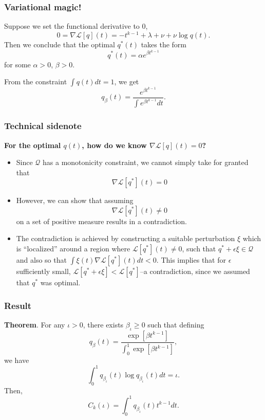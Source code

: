 \documentclass{beamer}
\begin{document}
\begin{frame}
\frametitle{Variational magic!}
Suppose we set the functional derivative to 0,
\[
0 = \nabla \mathcal{L}[q](t) = -t^{k-1} + \lambda + \nu + \nu \log q(t).
\]
Then we conclude that the optimal $q^*(t)$ takes the form
\[
q^*(t) = \alpha e^{\beta t^{k-1}}
\]
for some $\alpha > 0$, $\beta > 0$.

From the constraint $\int q(t)dt = 1$, we get
\[
q_\beta(t) = \frac{e^{\beta t^{k-1}}}{\int e^{\beta t^{k-1}} dt}.
\]
\end{frame}

\begin{frame}
\frametitle{Technical sidenote}
\textbf{For the optimal $q(t)$, how do we know $\nabla \mathcal{L}[q](t) = 0$?}

\begin{itemize}
\item Since $\mathcal{Q}$ has a monotonicity constraint, we cannot simply take for granted that
\[
\nabla \mathcal{L}[q^*](t) = 0
\]
\item However, we can show that assuming 
\[
\nabla \mathcal{L}[q^*](t) \neq 0
\]
on a set of positive measure results in a contradiction.
\item The contradiction is achieved by constructing a suitable
  perturbation $\xi$ which is ``localized'' around a region where
  $\mathcal{L}[q^*](t)\neq 0$, such that $q^* + \epsilon \xi \in
  \mathcal{Q}$ and also so that $\int \xi(t) \nabla
  \mathcal{L}[q^*](t) dt < 0$.  This implies that for $\epsilon$
  sufficiently small, $\mathcal{L}[q^* + \epsilon \xi] <
  \mathcal{L}[q^*]$--a contradiction, since we assumed that $q^*$ was
  optimal.
\end{itemize}
\end{frame}

\begin{frame}
\frametitle{Result}
\textbf{Theorem}.
For any $\iota > 0$, there exists $\beta_\iota \geq 0$ such that defining
\[
q_\beta(t) = \frac{\exp[\beta t^{k-1}]}{\int_0^1 \exp[\beta t^{k-1}]},
\]
we have
\[
\int_0^1 q_{\beta_\iota}(t) \log q_{\beta_\iota}(t) dt = \iota.
\]
Then,
\[
C_k(\iota) = \int_0^1 q_{\beta_\iota}(t) t^{k-1} dt.
\]
\end{frame}
\end{document}
